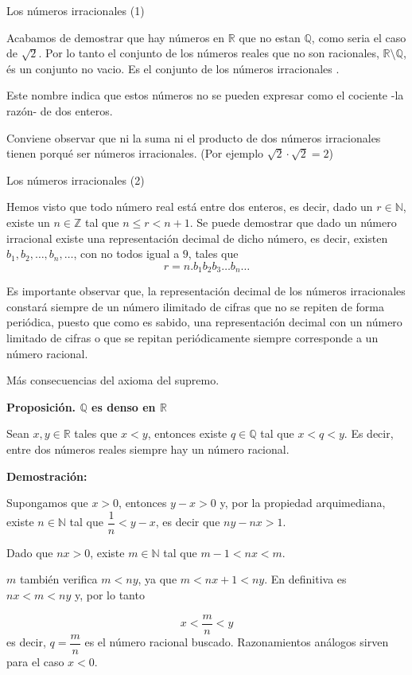 \documentclass[
  ignorenonframetext,
]{beamer}
\begin{document}
\begin{frame}{Los números irracionales (1)}
\protect\hypertarget{los-nuxfameros-irracionales-1}{}

Acabamos de demostrar que hay números en \(\mathbb{R}\) que no estan
\(\mathbb{Q}\), como seria el caso de \(\sqrt{2}\). Por lo tanto el
conjunto de los números reales que no son racionales,
\(\mathbb{R} \setminus \mathbb{Q}\), és un conjunto no vacio. Es el
conjunto de los números irracionales .

Este nombre indica que estos números no se pueden expresar como el
cociente -la razón- de dos enteros.

Conviene observar que ni la suma ni el producto de dos números
irracionales tienen porqué ser números irracionales. (Por ejemplo
\(\sqrt{2} \cdot \sqrt{2} = 2\))

\end{frame}

\begin{frame}{Los números irracionales (2)}
\protect\hypertarget{los-nuxfameros-irracionales-2}{}

Hemos visto que todo número real está entre dos enteros, es decir, dado
un \(r \in \mathbb{N}\), existe un \(n \in \mathbb{Z}\) tal que
\(n \leq r < n+1\). Se puede demostrar que dado un número irracional
existe una representación decimal de dicho número, es decir, existen
\(b_1,b_2, \ldots, b_n, \ldots\), con no todos igual a \(9\), tales que
\[
r = n.b_1b_2b_3 \ldots b_n \ldots
\]

Es importante observar que, la representación decimal de los números
irracionales constará siempre de un número ilimitado de cifras que no se
repiten de forma periódica, puesto que como es sabido, una
representación decimal con un número limitado de cifras o que se repitan
periódicamente siempre corresponde a un número racional.

\end{frame}

\begin{frame}{Más consecuencias del axioma del supremo.}
\protect\hypertarget{muxe1s-consecuencias-del-axioma-del-supremo.}{}

\textbf{Proposición. \(\mathbb{Q}\) es denso en \(\mathbb{R}\)}

Sean \(x,y \in \mathbb{R}\) tales que \(x<y\), entonces existe
\(q \in \mathbb{Q}\) tal que \(x<q<y\). Es decir, entre dos números
reales siempre hay un número racional.

\textbf{Demostración:}

Supongamos que \(x>0\), entonces \(y-x >0\) y, por la propiedad
arquimediana, existe \(n \in \mathbb{N}\) tal que \(\dfrac{1}{n} <y-x\),
es decir que \(ny-nx >1\).

Dado que \(nx >0\), existe \(m \in \mathbb{N}\) tal que \(m-1 <nx<m\).

\(m\) también verifica \(m<ny\), ya que \(m< nx+1<ny\). En definitiva es
\(nx<m<ny\) y, por lo tanto

\[
x<\dfrac{m}{n}<y
\] es decir, \(q = \dfrac{m}{n}\) es el número racional buscado.
Razonamientos análogos sirven para el caso \(x<0\).

\end{frame}
\end{document}
